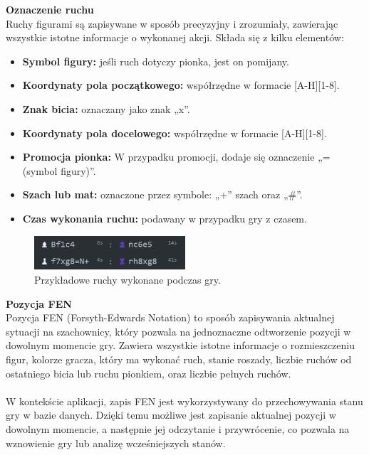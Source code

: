 \documentclass[12pt,a4paper]{article}
\begin{document}
\noindent \textbf{Oznaczenie ruchu}\\
Ruchy figurami są zapisywane w sposób precyzyjny i zrozumiały, zawierając wszystkie istotne informacje o wykonanej akcji. Składa się z kilku elementów:
\begin{itemize}
    \item \textbf{Symbol figury:} jeśli ruch dotyczy pionka, jest on pomijany.
    \item \textbf{Koordynaty pola początkowego:} współrzędne w formacie [A-H][1-8].
    \item \textbf{Znak bicia:} oznaczany jako znak „x”.
    \item \textbf{Koordynaty pola docelowego:} współrzędne w formacie [A-H][1-8].
    \item \textbf{Promocja pionka:} W przypadku promocji, dodaje się oznaczenie „=(symbol figury)”.
    \item \textbf{Szach lub mat:} oznaczone przez symbole: „+” szach oraz „\#”.
    \item \textbf{Czas wykonania ruchu:} podawany w przypadku gry z czasem.
\end{itemize}

\vspace{0.5cm}
\begin{figure}[h!]
    \centering
    \includegraphics[width=0.5\textwidth]{images/imp_moves.png}
    \caption{Przykładowe ruchy wykonane podczas gry.}
\end{figure}

\newpage

\noindent \textbf{Pozycja FEN}\\
Pozycja FEN (Forsyth-Edwards Notation) to sposób zapisywania aktualnej sytuacji na szachownicy, który pozwala na jednoznaczne odtworzenie pozycji w dowolnym momencie gry. Zawiera wszystkie istotne informacje o rozmieszczeniu figur, kolorze gracza, który ma wykonać ruch, stanie roszady, liczbie ruchów od ostatniego bicia lub ruchu pionkiem, oraz liczbie pełnych ruchów.
\\\\
W kontekście aplikacji, zapis FEN jest wykorzystywany do przechowywania stanu gry w bazie danych. Dzięki temu możliwe jest zapisanie aktualnej pozycji w dowolnym momencie, a następnie jej odczytanie i przywrócenie, co pozwala na wznowienie gry lub analizę wcześniejszych stanów.
\end{document}
